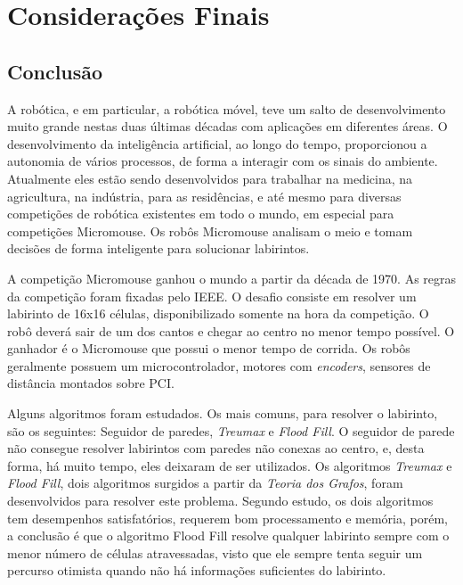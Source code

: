 \chapter{\textbf{Considerações Finais}}\label{Conclusao}

\section{Conclusão}

A robótica, e em particular, a robótica móvel, teve um salto de desenvolvimento muito grande nestas duas últimas décadas com aplicações em diferentes áreas. O desenvolvimento da inteligência artificial, ao longo do tempo, proporcionou a autonomia de vários processos, de forma a interagir com os sinais do ambiente. Atualmente eles estão sendo desenvolvidos para trabalhar na medicina, na agricultura, na indústria, para as residências, e até mesmo para diversas competições de robótica existentes em todo o mundo, em especial para competições Micromouse. Os robôs Micromouse analisam o meio e tomam decisões de forma inteligente para solucionar labirintos.

A competição Micromouse ganhou o mundo a partir da década de 1970. As regras da competição foram fixadas pelo IEEE. O desafio consiste em resolver um labirinto de 16x16 células, disponibilizado somente na hora da competição. O robô deverá sair de um dos cantos e chegar ao centro no menor tempo possível. O ganhador é o Micromouse que possui o menor tempo de corrida. Os robôs geralmente possuem um microcontrolador, motores com \emph{encoders}, sensores de distância montados sobre PCI.

Alguns algoritmos foram estudados. Os mais comuns, para resolver o labirinto, são os seguintes: Seguidor de paredes, \emph{Treumax} e \emph{Flood Fill}. O seguidor de parede não consegue resolver labirintos com paredes não conexas ao centro, e, desta forma, há muito tempo, eles deixaram de ser utilizados. Os algoritmos \emph{Treumax} e \emph{Flood Fill}, dois algoritmos surgidos a partir da \emph{Teoria dos Grafos}, foram desenvolvidos para resolver este problema. Segundo estudo, os dois algoritmos tem desempenhos satisfatórios, requerem bom processamento e memória, porém, a conclusão é que o algoritmo Flood Fill resolve qualquer labirinto sempre com o menor número de células atravessadas, visto que ele sempre tenta seguir um percurso otimista quando não há informações suficientes do labirinto. 

